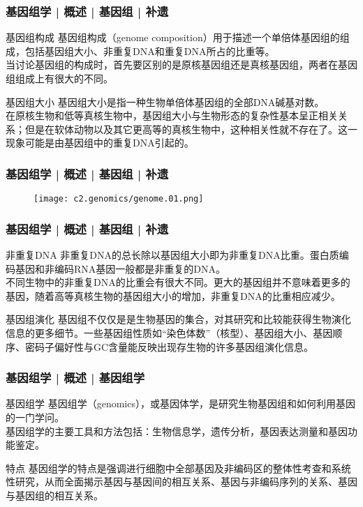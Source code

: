 \begin{frame}
  \frametitle{基因组学 | 概述 | 基因组 | 补遗}
  \begin{block}{基因组构成}
基因组构成（genome composition）用于描述一个单倍体基因组的组成，包括基因组大小、非重复DNA和重复DNA所占的比重等。\\
\vspace{1em}
当讨论基因组的构成时，首先要区别的是原核基因组还是真核基因组，两者在基因组组成上有很大的不同。
  \end{block}
  \pause
  \begin{block}{基因组大小}
基因组大小是指一种生物单倍体基因组的全部DNA碱基对数。\\
\vspace{1em}
在原核生物和低等真核生物中，基因组大小与生物形态的复杂性基本呈正相关关系；但是在软体动物以及其它更高等的真核生物中，这种相关性就不存在了。这一现象可能是由基因组中的重复DNA引起的。 
  \end{block}
\end{frame}

\begin{frame}
  \frametitle{基因组学 | 概述 | 基因组 | 补遗}
  \begin{figure}
    \centering
    \texttt{[image: c2.genomics/genome.01.png]}
  \end{figure}
\end{frame}

\begin{frame}
  \frametitle{基因组学 | 概述 | 基因组 | 补遗}
  \begin{block}{非重复DNA}
非重复DNA的总长除以基因组大小即为非重复DNA比重。蛋白质编码基因和非编码RNA基因一般都是非重复的DNA。\\
\vspace{1em}
不同生物中的非重复DNA的比重会有很大不同。更大的基因组并不意味着更多的基因，随着高等真核生物的基因组大小的增加，非重复DNA的比重相应减少。
  \end{block}
  \pause
  \begin{block}{基因组演化}
基因组不仅仅是是生物基因的集合，对其研究和比较能获得生物演化信息的更多细节。一些基因组性质如“染色体数”（核型）、基因组大小、基因顺序、密码子偏好性与GC含量能反映出现存生物的许多基因组演化信息。
  \end{block}
\end{frame}

\begin{frame}
  \frametitle{基因组学 | 概述 | 基因组学}
  \begin{block}{基因组学}
基因组学（genomics），或基因体学，是研究生物基因组和如何利用基因的一门学问。\\
\vspace{0.5em}
基因组学的主要工具和方法包括：生物信息学，遗传分析，基因表达测量和基因功能鉴定。
  \end{block}
  \pause
  \begin{block}{特点}
基因组学的特点是强调进行细胞中全部基因及非编码区的整体性考查和系统性研究，从而全面揭示基因与基因间的相互关系、基因与非编码序列的关系、基因与基因组的相互关系。
  \end{block}
\end{frame}

